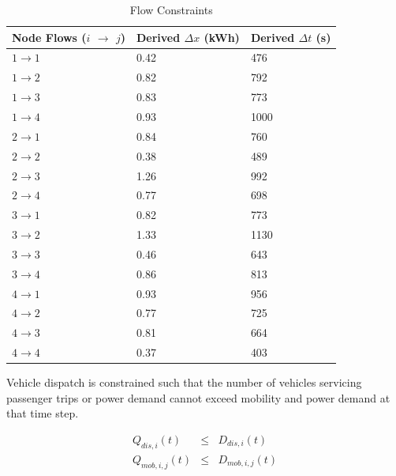 \documentclass[journal]{IEEEtran}
\begin{document}
\begin{table}[!htbp]
    \renewcommand{\arraystretch}{1}
    \caption{Flow Constraints}
    \label{tab:flow_constraints}
    \centering
    \def\colmargin{6.75cm}
    \begin{tabular}{lll}
    \hline
    \textbf{Node Flows ($i$ $\rightarrow$ $j$)} & \textbf{Derived} $\Delta x$ (kWh) & \textbf{Derived} $\Delta t$ (s) \\
    \hline
    $1\rightarrow1$ & 0.42  & 476  \\
    $1\rightarrow2$ & 0.82  & 792  \\
    $1\rightarrow3$ & 0.83  & 773  \\
    $1\rightarrow4$ & 0.93  & 1000  \\
    $2\rightarrow1$ & 0.84  & 760  \\
    $2\rightarrow2$ & 0.38  & 489  \\
    $2\rightarrow3$ & 1.26  & 992  \\
    $2\rightarrow4$ & 0.77  & 698  \\
    $3\rightarrow1$ & 0.82  & 773  \\
    $3\rightarrow2$ & 1.33  & 1130  \\
    $3\rightarrow3$ & 0.46  & 643  \\
    $3\rightarrow4$ & 0.86  & 813  \\
    $4\rightarrow1$ & 0.93  & 956  \\
    $4\rightarrow2$ & 0.77  & 725  \\
    $4\rightarrow3$ & 0.81  & 664  \\
    $4\rightarrow4$ & 0.37  & 403  \\
    \hline
    \end{tabular}
\end{table}

Vehicle dispatch is constrained such that the number of vehicles servicing passenger trips or power demand cannot exceed mobility and power demand at that time step.

\begin{eqnarray*}
   Q_{dis,i}(t) & \le & D_{dis,i}(t) \\
   Q_{mob,i,j}(t) & \le & D_{mob,i,j}(t) \\
\end{eqnarray*}
\end{document}
